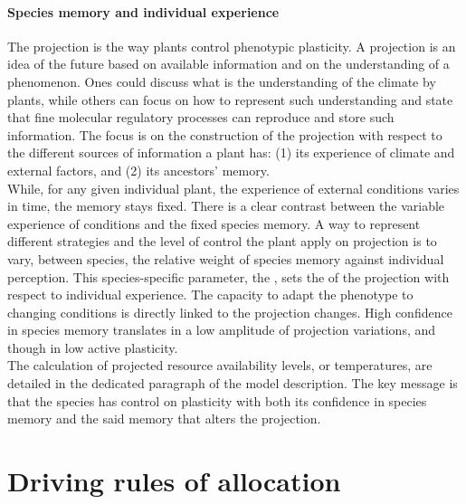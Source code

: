 \paragraph{Species memory and individual experience}
The projection is the way plants control phenotypic plasticity. A projection is an idea of the future based on available information and on the understanding of a phenomenon. Ones could discuss what is the understanding of the climate by plants, while others can focus on how to represent such understanding and state that fine molecular regulatory processes can reproduce and store such information. The focus is on the construction of the projection with respect to the different sources of information a plant has: (1) its experience of climate and external factors, and (2) its ancestors' memory.\\
While, for any given individual plant, the experience of external conditions varies in time, the memory stays fixed. There is a clear contrast between the variable experience of conditions and the fixed species memory. A way to represent different strategies and the level of control the plant apply on projection is to vary, between species, the relative weight of species memory against individual perception. This species-specific parameter, the , sets the  of the projection with respect to individual experience. The capacity to adapt the phenotype to changing conditions is directly linked to the projection changes. High confidence in species memory translates in a low amplitude of projection variations, and though in low active plasticity.\\
The calculation of projected resource availability levels, or temperatures, are detailed in the dedicated paragraph of the model description. The key message is that the species has control on plasticity with both its confidence in species memory and the said memory that alters the projection. %



\section{Driving rules of allocation}\label{section:allocation-rule}

